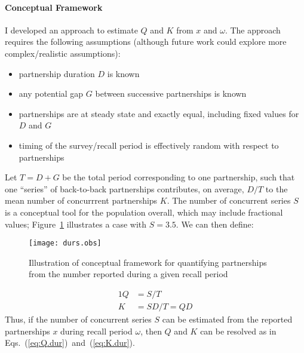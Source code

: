 \paragraph{Conceptual Framework}
I developed an approach to estimate $Q$ and $K$ from $x$ and $\omega$.
The approach requires the following assumptions
(although future work could explore more complex/realistic assumptions):
\begin{itemize}
  \item partnership duration $D$ is known
  \item any potential gap $G$ between successive partnerships is known
  \item partnerships are at steady state and exactly equal, including fixed values for $D$ and $G$
  \item timing of the survey/recall period is effectively random with respect to partnerships
\end{itemize}
Let $T = D + G$ be the total period corresponding to one partnership,
such that one ``series'' of back-to-back partnerships contributes, on average,
$D/T$ to the mean number of concurrrent partnerships $K$.
The number of concurrent series $S$ is a conceptual tool for the population overall,
which may include fractional values;
\eg Figure~\ref{fig:durs.obs} illustrates a case with $S = 3.5$.
We can then define:
\begin{figure}
  \centering
  \texttt{[image: durs.obs]}
  \caption{Illustration of conceptual framework for quantifying partnerships
    from the number reported during a given recall period}
  \label{fig:durs.obs}
\end{figure}
\begin{alignat}{1}
  Q &= S / T        \label{eq:Q.dur}\\
  K &= S D / T = QD \label{eq:K.dur}
\end{alignat}
Thus, if the number of concurrent series $S$ can be estimated from
the reported partnerships $x$ during recall period $\omega$,
then $Q$ and $K$ can be resolved as in Eqs.~(\ref{eq:Q.dur})~and~(\ref{eq:K.dur}).
\par
